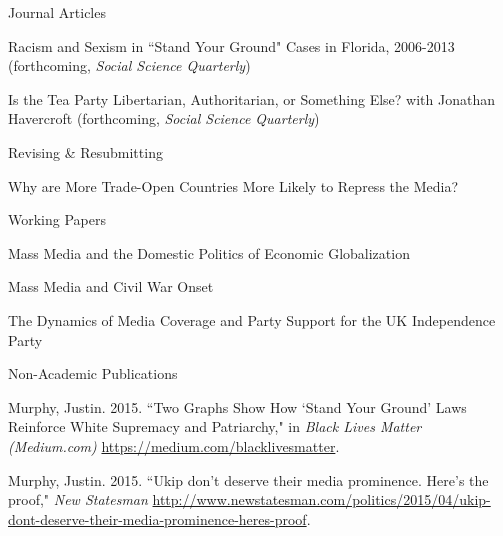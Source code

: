 \documentclass{resume} %
\begin{document}
\begin{rSection}{Journal Articles}

\begin{rSubsection}{}{}{}{}
\item Racism and Sexism in ``Stand Your Ground" Cases in Florida, 2006-2013 (forthcoming, \emph{Social Science Quarterly}) \vspace{.5em}
\item Is the Tea Party Libertarian, Authoritarian, or Something Else? with Jonathan Havercroft (forthcoming, \emph{Social Science Quarterly})
\end{rSubsection}

\begin{rSubsection}{Revising \& Resubmitting}{}{}{}
\item Why are More Trade-Open Countries More Likely to Repress the Media?
\end{rSubsection}


\begin{rSubsection}{Working Papers}{}{}{}
\item Mass Media and the Domestic Politics of Economic Globalization
\item Mass Media and Civil War Onset
\item The Dynamics of Media Coverage and Party Support for the UK Independence Party
\end{rSubsection}

\end{rSection}


\begin{rSection}{Non-Academic Publications}

\raggedright

\item Murphy, Justin. 2015. ``Two Graphs Show How `Stand Your Ground' Laws Reinforce White Supremacy and Patriarchy," in \emph{Black Lives Matter (Medium.com)} \url{https://medium.com/blacklivesmatter}. 
\item Murphy, Justin. 2015. ``Ukip don't deserve their media prominence. Here's the proof," \emph{New Statesman} \url{http://www.newstatesman.com/politics/2015/04/ukip-dont-deserve-their-media-prominence-heres-proof}.

\end{rSection}
\end{document}
